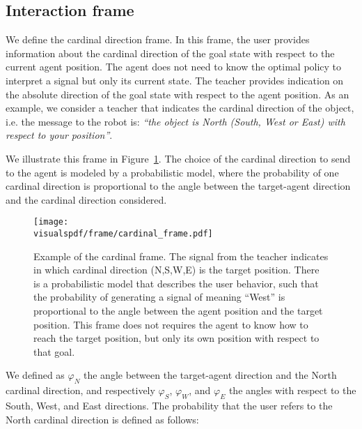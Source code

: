 \subsection{Interaction frame}

We define the cardinal direction frame. In this frame, the user provides information about the cardinal direction of the goal state with respect to the current agent position. The agent does not need to know the optimal policy to interpret a signal but only its current state. The teacher provides indication on the absolute direction of the goal state with respect to the agent position. As an example, we consider a teacher that indicates the cardinal direction of the object, i.e. the message to the robot is: \emph{``the object is North (South, West or East) with respect to your position''}.

We illustrate this frame in Figure~\ref{fig:cardinalframe}. The choice of the cardinal direction to send to the agent is modeled by a probabilistic model, where the probability of one cardinal direction is proportional to the angle between the target-agent direction and the cardinal direction considered.

\begin{figure}[!htbp]
    \centering
    \texttt{[image: \\visualspdf/frame/cardinal\_frame.pdf]}
    \caption{Example of the cardinal frame. The signal from the teacher indicates in which cardinal direction (N,S,W,E) is the target position. There is a probabilistic model that describes the user behavior, such that the probability of generating a signal of meaning ``West'' is proportional to the angle between the agent position and the target position. This frame does not requires the agent to know how to reach the target position, but only its own position with respect to that goal.}
    \label{fig:cardinalframe}
\end{figure}

We defined as $\varphi_N$ the angle between the target-agent direction and the North cardinal direction, and respectively $\varphi_S$, $\varphi_W$, and $\varphi_E$ the angles with respect to the South, West, and East directions. The probability that the user refers to the North cardinal direction is defined as follows:

